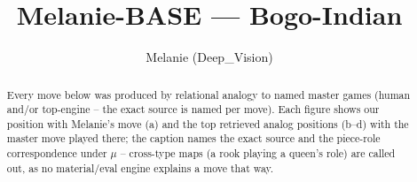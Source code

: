 \documentclass[11pt]{article}
\title{Melanie-BASE — Bogo-Indian}
\author{Melanie (Deep\_Vision)}
\date{}
\begin{document}
\maketitle

\begin{abstract}Every move below was produced by relational analogy to named master games (human and/or top-engine -- the exact source is named per move). Each figure shows our position with Melanie's move (a) and the top retrieved analog positions (b--d) with the master move played there; the caption names the exact source and the piece-role correspondence under $\mu$ -- cross-type maps (a rook playing a queen's role) are called out, as no material/eval engine explains a move that way.\end{abstract}

\begin{figure}[p]\centering
\begin{subfigure}{0.46\textwidth}\centering
\resizebox{\linewidth}{!}{%
\newchessgame
\chessboard[
  setfen={r1b1k2r/ppppqppp/2n1pn2/8/2PP4/2b2NP1/PP1BPP1P/R2QKB1R w KQkq - 0 7},
  showmover=false,
  pgfstyle=straightmove, color=movearrow, markmove={d2-c3}
]}
\caption{}
\end{subfigure}\hfill
\begin{subfigure}{0.46\textwidth}\centering
\resizebox{\linewidth}{!}{%
\newchessgame
\chessboard[
  setfen={r1b1k2r/ppppqppp/2n1pn2/8/2PP4/2b2NP1/PP1BPP1P/R2QKB1R w KQkq - 0 7},
  showmover=false,
  pgfstyle=straightmove, color=movearrow, markmove={d2-c3}
]}
\caption{}
\end{subfigure}
\\[4pt]
\begin{subfigure}{0.46\textwidth}\centering
\resizebox{\linewidth}{!}{%
\newchessgame
\chessboard[
  setfen={r1b1k2r/ppppqppp/2n1pn2/8/2PP4/2b2NP1/PP1BPP1P/R2QKB1R w KQkq - 0 7},
  showmover=false,
  pgfstyle=straightmove, color=movearrow, markmove={d2-c3}
]}
\caption{}
\end{subfigure}\hfill
\begin{subfigure}{0.46\textwidth}\centering
\resizebox{\linewidth}{!}{%
\newchessgame
\chessboard[
  setfen={r1b1k2r/ppppqppp/2n1pn2/8/2PP4/2b2NP1/PP1BPP1P/R2QKB1R w KQkq - 0 7},
  showmover=false,
  pgfstyle=straightmove, color=movearrow, markmove={d2-c3}
]}
\caption{}
\end{subfigure}

\end{figure}
\end{document}
